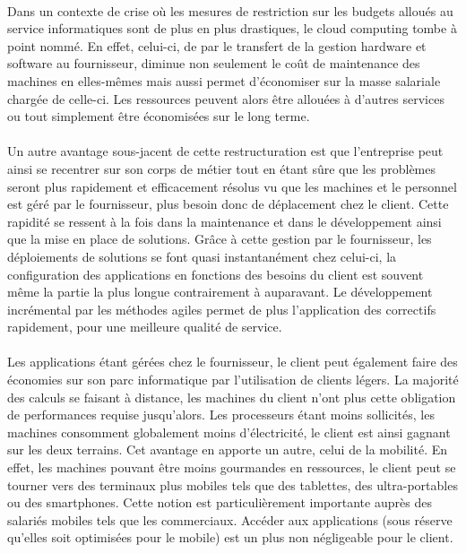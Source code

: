 \documentclass[a4paper,12pt]{report}
\begin{document}
\begin{onehalfspace}
	\paragraph*{}
	Dans un contexte de crise où les mesures de restriction sur les budgets alloués au service informatiques sont de plus en plus drastiques, le cloud computing tombe à point nommé. En effet, celui-ci, de par le transfert de la gestion hardware et software au fournisseur, diminue non seulement le coût de maintenance des machines en elles-mêmes mais aussi permet d’économiser sur la masse salariale chargée de celle-ci. Les ressources peuvent alors être allouées à d’autres services ou tout simplement être économisées sur le long terme.

	\paragraph*{}
	Un autre avantage sous-jacent de cette restructuration est que l’entreprise peut ainsi se recentrer sur son corps de métier tout en étant sûre que les problèmes seront plus rapidement et efficacement résolus vu que les machines et le personnel est géré par le fournisseur, plus besoin donc de déplacement chez le client. Cette rapidité se ressent à la fois dans la maintenance et dans le développement ainsi que la mise en place de solutions. Grâce à cette gestion par le fournisseur, les déploiements de solutions se font quasi instantanément chez celui-ci, la configuration des applications en fonctions des besoins du client est souvent même la partie la plus longue contrairement à auparavant. Le développement incrémental par les méthodes agiles permet de plus l’application des correctifs rapidement, pour une meilleure qualité de service.	

	\paragraph*{}
	Les applications étant gérées chez le fournisseur, le client peut également faire des économies sur son parc informatique par l’utilisation de clients légers. La majorité des calculs se faisant à distance, les machines du client n’ont plus cette obligation de performances requise jusqu’alors. Les processeurs étant moins sollicités, les machines consomment globalement moins d’électricité, le client est ainsi gagnant sur les deux terrains.\newline
Cet avantage en apporte un autre, celui de la mobilité. En effet, les machines pouvant être moins gourmandes en ressources, le client peut se tourner vers des terminaux plus mobiles tels que des tablettes, des ultra-portables ou des smartphones. Cette notion est particulièrement importante auprès des salariés mobiles tels que les commerciaux. Accéder aux applications (sous réserve qu’elles soit optimisées pour le mobile) est un plus non négligeable pour le client.



\end{onehalfspace}
\end{document}
